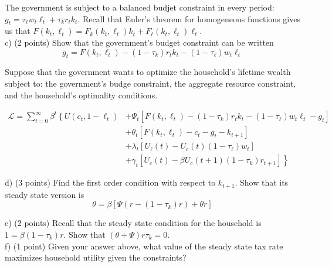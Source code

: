 \documentclass[12pt]{article}
\begin{document}
\begin{enumerate}[1.]
The government is subject to a balanced budjet constraint in every period: $g_{t} = \tau_{\ell}w_{t}\ell_{t} + \tau_{k}r_{t}k_{t}$. Recall that Euler's theorem for homogeneous functions gives us that $F(k_{t}, \ell_{t}) = F_{k}(k_{t}, \ell_{t}) k_{t} + F_{\ell}(k_{t}, \ell_{t}) \ell_{t}$.\\

c) (2 points) Show that the government's budget constraint can be written 
\[g_{t} = F(k_{t}, \ell_{t}) - (1-\tau_{k})r_{t}k_{t} - (1-\tau_{\ell})w_{t}\ell_{t}\]

Suppose that the government wants to optimize the household's lifetime wealth subject to: the government's budge constraint, the aggregate resource constraint, and the household's optimality conditions.

\begin{align*}
\mathcal{L} = \sum_{t=0}^{\infty}\beta^{t}\left\{ U(c_{t}, 1-\ell_{t}) \right.&+ \Psi_{t}\left[ F(k_{t}, \ell_{t}) - (1-\tau_{k})r_{t}k_{t} - (1-\tau_{\ell})w_{t}\ell_{t} - g_{t} \right]\\
&+ \theta_{t}\left[ F(k_{t}, \ell_{t}) - c_{t} - g_{t} - k_{t+1} \right]\\
&+ \lambda_{t}[U_{\ell}(t) - U_{c}(t) (1-\tau_{\ell})w_{t}]\\
&+ \left. \gamma_{t}[U_{c}(t) - \beta U_{c}(t+1)(1-\tau_{k})r_{t+1}]\right\}
\end{align*}

d) (3 points) Find the first order condition with respect to $k_{t+1}$. Show that its steady state version is 
\[\theta = \beta\left[\Psi(r - (1-\tau_{k})r) + \theta r  \right] \]

e) (2 points) Recall that the steady state condition for the household is $1 = \beta (1-\tau_{k}) r$. Show that $(\theta + \Psi) r \tau_{k} = 0$.\\

f) (1 point) Given your answer above, what value of the steady state tax rate maximizes household utility given the constraints?


\end{enumerate}
\end{document}
